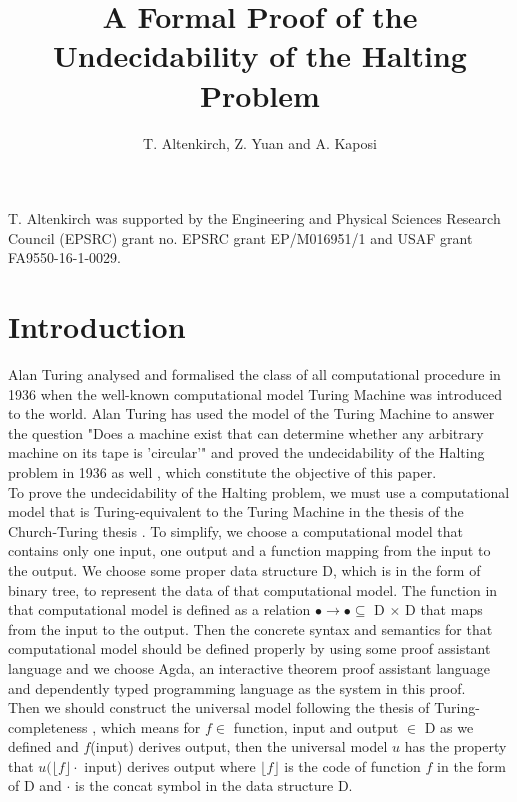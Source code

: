 \documentclass{jfrarticle}
\title{A Formal Proof of the Undecidability of the Halting Problem}
\author{T. Altenkirch, Z. Yuan and A. Kaposi}
{THORSTEN ALTENKIRCH, ZONGZHE YUAN and AMBRUS KAPOSI\\School of Computer Science, University of Nottingham}
\begin{document}
\begin{bottomstuff}
T. Altenkirch was supported by the Engineering and Physical Sciences
Research Council (EPSRC) grant no. EPSRC grant EP/M016951/1 and USAF grant FA9550-16-1-0029.
\end{bottomstuff}
\maketitle 

\section{Introduction}
Alan Turing analysed and formalised the class of all computational procedure in 1936 \cite{turing_computable_1936} when the well-known computational model Turing Machine was introduced to the world.
Alan Turing has used the model of the Turing Machine to answer the question "Does a machine exist that can determine whether any arbitrary machine on its tape is 'circular'" and proved the undecidability of the Halting problem in 1936 as well \cite{turing_computable_1936}, which constitute the objective of this paper.\\
To prove the undecidability of the Halting problem, we must use a computational model that is Turing-equivalent to the Turing Machine in the thesis of the Church-Turing thesis \cite{copeland_church-turing_2002}.
To simplify, we choose a computational model that contains only one input, one output and a function mapping from the input to the output.
We choose some proper data structure D, which is in the form of binary tree, to represent the data of that computational model.
The function in that computational model is defined as a relation $\bullet \rightarrow \bullet \subseteq$ D $\times$ D that maps from the input to the output.
Then the concrete syntax and semantics for that computational model should be defined properly by using some proof assistant language and we choose Agda, an interactive theorem proof assistant language and dependently typed programming language \cite{agda} as the system in this proof.\\
Then we should construct the universal model following the thesis of Turing-completeness \cite{copeland_church-turing_2002}, which means for $f \in$ function, input and output $\in$ D as we defined and $f$(input) derives output, then the universal model $u$ has the property that $u(\lfloor f\rfloor \cdot $ input) derives output where $\lfloor f\rfloor$ is the code of function $f$ in the form of D and $\cdot$ is the concat symbol in the data structure D.\\
\end{document}
